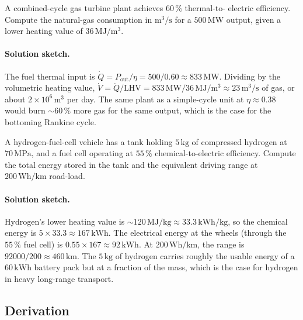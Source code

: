 \begin{exercise}
A combined-cycle gas turbine plant achieves $60\,\%$ thermal-to-
electric efficiency. Compute the natural-gas consumption in $\si{
\meter\cubed\per\second}$ for a $500\,\si{\mega\watt}$ output, given
a lower heating value of $36\,\si{\mega\joule\per\meter\cubed}$.
\paragraph{Solution sketch.}
The fuel thermal input is $\dot{Q} = P_{\text{out}}/\eta = 500/0.60
\approx 833\,\si{\mega\watt}$. Dividing by the volumetric heating value,
$\dot{V} = \dot{Q}/\text{LHV} = 833\,\si{\mega\watt}/36\,\si{\mega\joule
\per\meter\cubed} \approx 23\,\si{\meter\cubed\per\second}$ of gas, or
about $2\times10^{6}\,\si{\meter\cubed}$ per day. The same plant as a
simple-cycle unit at $\eta \approx 0.38$ would burn $\sim 60\,\%$ more
gas for the same output, which is the case for the bottoming Rankine
cycle.
\end{exercise}

\begin{exercise}
A hydrogen-fuel-cell vehicle has a tank holding $5\,\si{\kilogram}$
of compressed hydrogen at $70\,\si{\mega\pascal}$, and a fuel cell
operating at $55\,\%$ chemical-to-electric efficiency. Compute the
total energy stored in the tank and the equivalent driving range at
$200\,\si{\watt\hour\per\kilo\meter}$ road-load.
\paragraph{Solution sketch.}
Hydrogen's lower heating value is $\sim 120\,\si{\mega\joule\per\kilogram}
\approx 33.3\,\si{\kilo\watt\hour\per\kilogram}$, so the chemical energy
is $5\times33.3 \approx 167\,\si{\kilo\watt\hour}$. The electrical
energy at the wheels (through the $55\,\%$ fuel cell) is $0.55\times167
\approx 92\,\si{\kilo\watt\hour}$. At $200\,\si{\watt\hour\per\kilo
\meter}$, the range is $92000/200 \approx 460\,\si{\kilo\meter}$. The
$5\,\si{\kilogram}$ of hydrogen carries roughly the usable energy of a
$60\,\si{\kilo\watt\hour}$ battery pack but at a fraction of the mass,
which is the case for hydrogen in heavy long-range transport.
\end{exercise}

\subsection*{Derivation}

